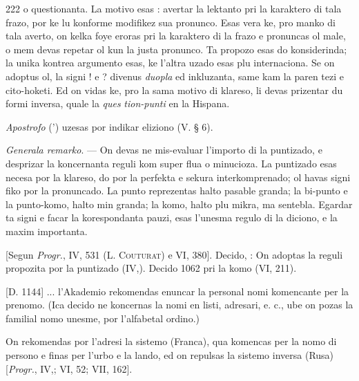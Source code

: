 \begin{VUpage}[226]{222}
\VUcontinue
o questionanta. La motivo esas : avertar la lektanto pri la\nl
karaktero di tala frazo, por ke lu konforme modifikez sua\nl
pronunco. Esas vera ke, pro manko di tala averto, on kelka\cc
foye eroras pri la karaktero di la frazo e pronuncas ol male,\nl
o mem devas repetar ol kun la justa pronunco. Ta propozo\nl
esas do konsiderinda; la unika kontrea argumento esas, ke\nl
l'altra uzado esas plu internaciona. Se on adoptus ol, la\nl
signi ! e ? divenus \textit{duopla} ed inkluzanta, same kam la paren\cc
tezi e cito-hoketi. Ed on vidas ke, pro la sama motivo di\nl
klareso, li devas prizentar du formi inversa, quale la \textit{ques}\cc
\textit{tion-punti} en la Hispana.

\textit{Apostrofo} (') uzesas por indikar eliziono (V. § 6).

\VUblanc{1.96mm}
\textit{Generala remarko}. --- On devas ne mis-evaluar l'importo\nl
di la puntizado, e desprizar la koncernanta reguli kom super\cc
flua o minucioza. La puntizado esas necesa por la klareso,\nl
do por la perfekta e sekura interkomprenado; ol havas signi\cc
fiko por la pronuncado. La punto reprezentas halto pasable\nl
granda; la bi-punto e la punto-komo, halto min granda;\nl
la komo, halto plu mikra, ma sentebla. Egardar ta signi e\nl
facar la korespondanta pauzi, esas l'unesma regulo di la\nl
diciono, e la maxim importanta.

[Segun \textit{Progr.}, IV, 531 (L. \textsc{Couturat}) e VI, 380]. Decido, : On adoptas la reguli propozita por la puntizado (IV,). Decido 1062 pri la komo (VI, 211).

\VUsaut{6.86mm}
\VUfilet{8.13mm}
\VUsaut{3.20mm}
\VUsaut{1.56mm}
\VUsaut{4.24mm}

[D. 1144] ... l'Akademio rekomendas enuncar la personal\nl
nomi komencante per la prenomo. (Ica decido ne koncernas\nl
la nomi en listi, adresari, e. c., ube on pozas la familial\nl
nomo unesme, por l'alfabetal ordino.)

On rekomendas por l'adresi la sistemo (Franca), qua\nl
komencas per la nomo di persono e finas per l'urbo e la\nl
lando, ed on repulsas la sistemo inversa (Rusa) [\textit{Progr.}, IV,; VI, 52; VII, 162].
\end{VUpage}

